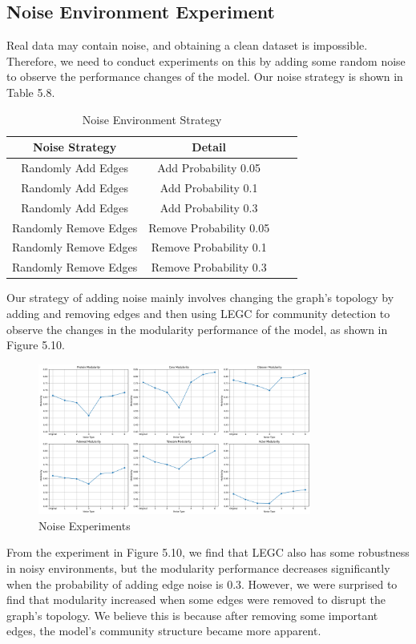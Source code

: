 \documentclass[ %
                    author={Tengyao Tu},
                supervisor={Dr. James Pope},
                    degree={MSc},
                     title={A New Perspective on Graph Community Detection: Combining Traditional Methods with Deep Learning Approaches},
                  subtitle={Applying to Telecom Networks and Diverse Datasets},
                      type={},
                      year={2024}]{dissertation}
\begin{document}
\subsection{Noise Environment Experiment}
Real data may contain noise, and obtaining a clean dataset is impossible. Therefore, we need to conduct experiments on this by adding some random noise to observe the performance changes of the model. Our noise strategy is shown in Table 5.8.
\begin{table}[!htbp] 
\centering 
\label{Basic Infomation} 
\caption{Noise Environment Strategy} 
\vspace{5pt} 
\begin{tabular}{cccc} 
\hline 
Noise Strategy&Detail\\ 
\hline
Randomly Add Edges&Add Probability 0.05\\
Randomly Add Edges&Add Probability 0.1\\
Randomly Add Edges&Add Probability 0.3\\
Randomly Remove Edges&Remove Probability 0.05\\
Randomly Remove Edges&Remove Probability 0.1\\
Randomly Remove Edges&Remove Probability 0.3\\
\hline
\end{tabular}
\end{table}
Our strategy of adding noise mainly involves changing the graph's topology by adding and removing edges and then using LEGC for community detection to observe the changes in the modularity performance of the model, as shown in Figure 5.10.
\begin{figure}[h] %
    \centering
    \includegraphics[width=0.8\textwidth]{Figure_17.png} %
    \caption{Noise Experiments}
\end{figure}
From the experiment in Figure 5.10, we find that LEGC also has some robustness in noisy environments, but the modularity performance decreases significantly when the probability of adding edge noise is 0.3. However, we were surprised to find that modularity increased when some edges were removed to disrupt the graph's topology. We believe this is because after removing some important edges, the model's community structure became more apparent. 
\end{document}
